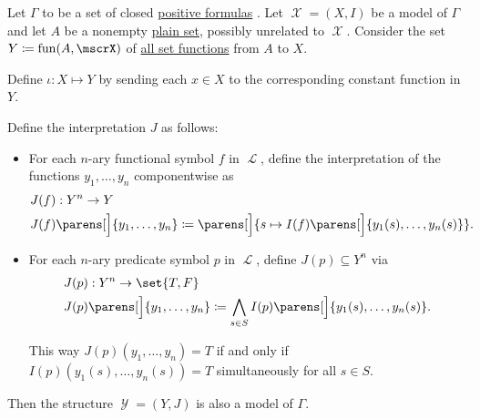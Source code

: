 \begin{proposition}\label{thm:functions_over_model_form_model}
  Let \( \Gamma \) to be a set of closed \hyperref[def:positive_formula]{positive formulas} . Let \( \mscrX = (X, I) \) be a model of \( \Gamma \) and let \( A \) be a nonempty \hyperref[def:set]{plain set}, possibly unrelated to \( \mscrX \). Consider the set \( Y \coloneqq \fun(A, \mscrX) \) of \hyperref[def:function]{all set functions} from \( A \) to \( X \).

  Define \( \iota: X \mapsto Y \) by sending each \( x \in X \) to the corresponding constant function in \( Y \).

  Define the interpretation \( J \) as follows:
  \begin{itemize}
    \item For each \( n \)-ary functional symbol \( f \) in \( \mscrL \), define the interpretation of the functions \( y_1, \ldots, y_n \) componentwise as
    \begin{equation*}
      \begin{aligned}
        &J(f): Y^n \to Y \\
        &J(f) \parens[\Big]{ y_1, \ldots, y_n } \coloneqq \parens[\Big]{ s \mapsto I(f) \parens[\Big]{ y_1(s), \ldots, y_n(s) } }.
      \end{aligned}
    \end{equation*}

    \item For each \( n \)-ary predicate symbol \( p \) in \( \mscrL \), define \( J(p) \subseteq Y^n \) via
    \begin{equation*}
      \begin{aligned}
        &J(p): Y^n \to \set{ T, F } \\
        &J(p) \parens[\Big]{ y_1, \ldots, y_n } \coloneqq \bigwedge_{s \in S} I(p) \parens[\Big]{ y_1(s), \ldots, y_n(s) }.
      \end{aligned}
    \end{equation*}

    This way \( J(p) (y_1, \ldots, y_n) = T \) if and only if \( I(p) (y_1(s), \ldots, y_n(s)) = T \) simultaneously for all \( s \in S \).
  \end{itemize}

  Then the structure \( \mscrY = (Y, J) \) is also a model of \( \Gamma \).
\end{proposition}
